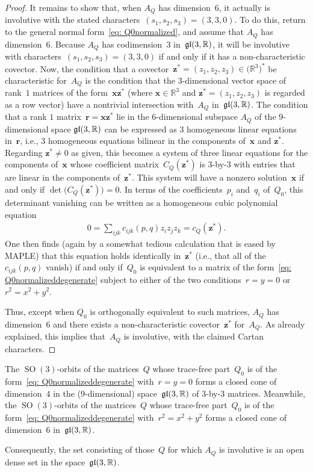 \documentclass[pdftex]{sigma}
\numberwithin{equation}{section}
\newcommand{\bbR}{{\mathbb R}}
\newcommand{\SO}{\operatorname{SO}}
\newcommand{\eugl}{\operatorname{\frak{gl}}}
\newcommand{\mbx}{\mathbf{x}}
\newcommand{\mbz}{\mathbf{z}}
\begin{document}
\begin{proof}
It remains to show that, when $A_Q$ has dimension~$6$,
it actually is involutive with the stated characters~$(s_1,s_2,s_3)=(3,3,0)$.
To do this, return to the general normal form~\eqref{eq: Q0normalized},
and assume that $A_Q$ has dimension~$6$.
Because $A_Q$ has codimension~$3$ in~$\eugl(3,\bbR)$,
it will be involutive with characters~$(s_1,s_2,s_3)=(3,3,0)$
if and only if it has a non-characteristic covector.
Now, the condition that a covector~$\mbz^* = (z_1,z_2,z_3)\in \big(\bbR^3\big)^*$
be characteristic for~$A_Q$ is the condition
that the $3$-dimensional vector space of rank~$1$ matrices
of the form~$\mbx \mbz^*$ (where $\mbx\in\bbR^3$ and $\mbz^* = (z_1,z_2,z_3)$
is regarded as a row vector) have a nontrivial intersection
with~$A_Q$ in~$\eugl(3,\mathbb{R})$.
The condition that a rank $1$ matrix~$\mathbf{r} = \mathbf{x}\mathbf{z}^*$
lie in the $6$-dimensional subspace $A_Q$ of the $9$-dimensional space
$\frak{gl}(3,\mathbb{R})$ can be expressed as 3 homogeneous linear equations in~$\mathbf{r}$,
i.e., $3$ homogeneous equations bilinear in the components
of~$\mathbf{x}$ and $\mathbf{z}^*$. Regarding $\mathbf{z}^*\not=0$ as given,
this becomes a system of three linear equations for the components
of~$\mathbf{x}$ whose coefficient matrix~$C_Q(\mathbf{z}^*)$ is $3$-by-$3$
with entries that are linear in the components of~$\mathbf{z}^*$.
This system will have a nonzero solution~$\mathbf{x}$
if and only if $\det\bigl(C_Q(\mathbf{z}^*)\bigr) = 0$.
In terms of the coefficients~$p_i$ and~$q_i$ of~$Q_0$,
this determinant vanishing can be written
as a homogeneous cubic polynomial equation
\begin{gather*}%
0 = \sum_{ijk} c_{ijk}(p,q) z_i z_j z_k = c_Q(\mbz^*).
\end{gather*}
One then finds (again by a somewhat tedious calculation
that is eased by MAPLE) that this equation holds identically in~$\mbz^*$
(i.e., that all of the~$c_{ijk}(p,q)$ vanish) if and only if~$Q_0$
is equivalent to a matrix of the form~\eqref{eq: Q0normalizeddegenerate}
subject to either of the two conditions~$r=y=0$ or $r^2 = x^2+y^2$.

Thus, except when $Q_0$ is orthogonally equivalent to such matrices,
$A_Q$ has dimension~$6$ and there exists a non-characteristic covector~$\mbz^*$ for~$A_Q$. As already explained, this implies that~$A_Q$ is
involutive, with the claimed Cartan characters.
\end{proof}

\begin{Remark}The $\SO(3)$-orbits of the matrices~$Q$
whose trace-free part~$Q_0$
is of the form~\eqref{eq: Q0normalizeddegenerate}
with~$r=y=0$ forms a closed cone of dimension~$4$
in the ($9$-dimensional) space~$\eugl(3,\mathbb{R})$
of $3$-by-$3$ matrices.
Meanwhile, the $\SO(3)$-orbits of the matrices~$Q$
whose trace-free part~$Q_0$
is of the form~\eqref{eq: Q0normalizeddegenerate}
with~$r^2=x^2+y^2$ forms a closed cone of dimension~$6$
in~$\eugl(3,\mathbb{R})$.

Consequently, the set consisting of those~$Q$
for which $A_Q$ is involutive is an open dense set
in the space~$\eugl(3,\mathbb{R})$.
\end{Remark}
\end{document}
